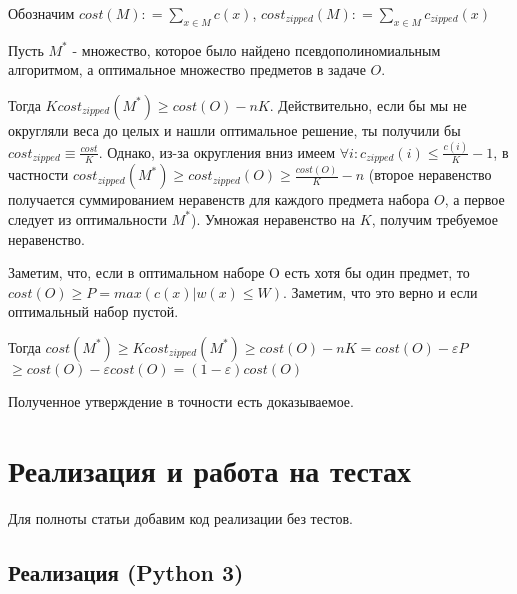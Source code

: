 \documentclass{article}
\begin{document}
Обозначим $cost(M) : = \sum\limits_{x \in M} c(x)$,  $cost_{zipped}(M) : = \sum\limits_{x \in M} c_{zipped}(x)$

Пусть $M^*$ - множество, которое было найдено псевдополиномиальным алгоритмом, а оптимальное множество предметов в задаче $O$.

Тогда $K cost_{zipped}(M^*) \geq cost(O) -  nK$. Действительно, если бы мы не округляли веса до целых и нашли оптимальное решение, ты получили бы $ cost_{zipped} \equiv \frac{cost}{K}$. Однако, из-за округления вниз имеем  $\forall i: c_{zipped}(i) \leq \frac{c(i)}{K} - 1$, в частности $cost_{zipped}(M^*) \geq cost_{zipped}(O) \geq \frac{cost(O)}{K} - n$ (второе неравенство получается суммированием неравенств для каждого предмета набора $O$, а первое следует из оптимальности $M^*$). Умножая неравенство на $K$, получим требуемое неравенство.

Заметим, что, если в оптимальном наборе O есть хотя бы один предмет, то 
$cost(O) \geq P = max(c(x) | w(x) \leq W)$. Заметим, что это верно и если оптимальный набор пустой.

Тогда $cost(M^*) \geq $$ K cost_{zipped} (M^*) \geq $$ cost(O) -  nK $$= cost(O) - \varepsilon P $$ \geq cost(O) - \varepsilon cost(O) $$ = (1 - \varepsilon) cost(O)$

Полученное утверждение в точности есть доказываемое.





\section{Реализация и работа на тестах}
Для полноты статьи добавим код реализации без тестов.
\subsection{Реализация (Python 3)}
\end{document}
